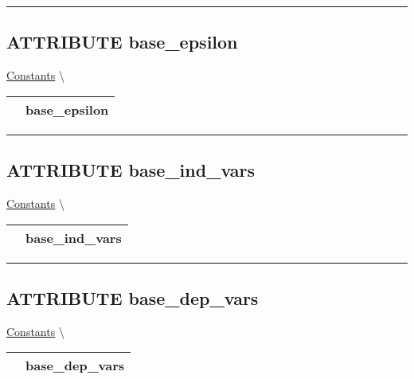 \par


\rule{\linewidth}{0.5pt}
\subsection*{\textsf{\colorbox{headtoc}{\color{white} ATTRIBUTE}
base\_epsilon}}

\hypertarget{ecldoc:constants.base_epsilon}{}
\hspace{0pt} \hyperlink{ecldoc:Constants}{Constants} \textbackslash 

{\renewcommand{\arraystretch}{1.5}
\begin{tabularx}{\textwidth}{|>{\raggedright\arraybackslash}l|X|}
\hline
\hspace{0pt}\mytexttt{\color{red} } & \textbf{base\_epsilon} \\
\hline
\end{tabularx}
}

\par


\rule{\linewidth}{0.5pt}
\subsection*{\textsf{\colorbox{headtoc}{\color{white} ATTRIBUTE}
base\_ind\_vars}}

\hypertarget{ecldoc:constants.base_ind_vars}{}
\hspace{0pt} \hyperlink{ecldoc:Constants}{Constants} \textbackslash 

{\renewcommand{\arraystretch}{1.5}
\begin{tabularx}{\textwidth}{|>{\raggedright\arraybackslash}l|X|}
\hline
\hspace{0pt}\mytexttt{\color{red} } & \textbf{base\_ind\_vars} \\
\hline
\end{tabularx}
}

\par


\rule{\linewidth}{0.5pt}
\subsection*{\textsf{\colorbox{headtoc}{\color{white} ATTRIBUTE}
base\_dep\_vars}}

\hypertarget{ecldoc:constants.base_dep_vars}{}
\hspace{0pt} \hyperlink{ecldoc:Constants}{Constants} \textbackslash 

{\renewcommand{\arraystretch}{1.5}
\begin{tabularx}{\textwidth}{|>{\raggedright\arraybackslash}l|X|}
\hline
\hspace{0pt}\mytexttt{\color{red} } & \textbf{base\_dep\_vars} \\
\hline
\end{tabularx}
}

